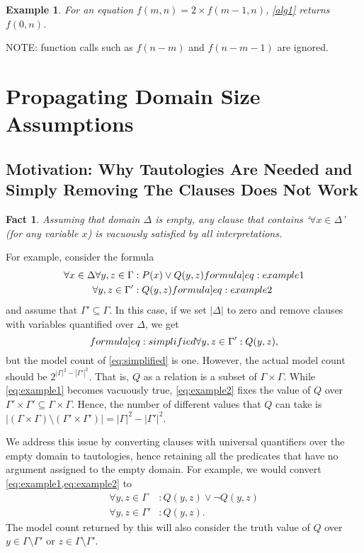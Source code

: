 \documentclass{article}
\newtheorem{example}{Example}
\newtheorem{fact}{Fact}
\begin{document}
\begin{example}
  For an equation $f(m, n) = 2 \times f(m-1, n)$, \cref{alg1} returns $f(0, n)$.
\end{example}

NOTE: function calls such as $f(n-m)$ and $f(n-m-1)$ are ignored.

\section{Propagating Domain Size Assumptions}\label{sec:simplifying}

\subsection{Motivation: Why Tautologies Are Needed and Simply Removing The
  Clauses Does Not Work}

\begin{fact}
  Assuming that domain $\Delta$ is empty, any clause that contains
  `$\forall x \in \Delta$' (for any variable $x$) is vacuously satisfied by all
  interpretations.
\end{fact}

For example, consider the formula
\begin{align}
  \forall x \in \Delta \forall y, z \in \Gamma &: P(x) \lor Q(y, z)\label[formula]{eq:example1}\\
  \forall y, z \in \Gamma' &: Q(y, z)\label[formula]{eq:example2}
\end{align}
and assume that $\Gamma' \subseteq \Gamma$. In this case, if we set $|\Delta|$
to zero and remove clauses with variables quantified over $\Delta$, we get
\begin{equation}\label[formula]{eq:simplified}
  \forall y, z \in \Gamma' : Q(y, z),
\end{equation}
but the model count of \cref{eq:simplified} is one. However, the actual model
count should be $2^{|\Gamma|^2 - |\Gamma'|^2}$. That is, $Q$ as a relation is a
subset of $\Gamma \times \Gamma$. While \cref{eq:example1} becomes vacuously
true, \cref{eq:example2} fixes the value of $Q$ over
$\Gamma' \times \Gamma' \subseteq \Gamma \times \Gamma$. Hence, the number of
different values that $Q$ can take is
$|(\Gamma \times \Gamma) \setminus (\Gamma' \times \Gamma')| = |\Gamma|^{2} - |\Gamma'|^{2}$.

We address this issue by converting clauses with universal quantifiers over the
empty domain to tautologies, hence retaining all the predicates that have no
argument assigned to the empty domain. For example, we would convert
\cref{eq:example1,eq:example2} to
\begin{align*}
  \forall y, z \in \Gamma &: Q(y, z) \lor \neg Q(y, z) \\
  \forall y, z \in \Gamma' &: Q(y, z).
\end{align*}
The model count returned by this will also consider the truth value of $Q$ over
$y \in \Gamma \setminus \Gamma'$ or $z \in \Gamma \setminus \Gamma'$.
\end{document}
